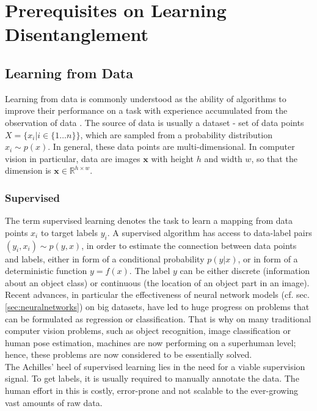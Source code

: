 \chapter{Prerequisites on Learning Disentanglement}\label{sec:prerequisites}

\section{Learning from Data}
	{Learning from data} is commonly understood as the ability of algorithms to improve their performance on a task with experience accumulated from the observation of data \cite{goodfellow16dlb}. The source of data is usually a dataset - set of data points $X = \{x_i | i \in \{1\ldots n\} \}$, which are sampled from a probability distribution $x_i \sim p(x)$.
	In general, these data points are multi-dimensional. In computer vision in particular, data are images $\mathbf{x}$ with height $h$ and width $w$, so that the dimension is $\mathbf{x} \in \mathbb{R}^{h \times w}$.

	\subsection{Supervised}\label{sec:supervised}
		The term {supervised learning} denotes the task to learn a mapping from data points $x_i$ to target labels $y_i$.
		A supervised algorithm has access to data-label pairs  $(y_i, x_i) \sim p(y, x)$, in order to estimate the connection between data points and labels, either in form of a conditional probability $p(y|x)$, or in form of a deterministic function $y = f(x)$.
		The label $y$ can be either discrete (\eg information about an object class) or continuous (\eg the location of an object part in an image).
		Recent advances, in particular the effectiveness of neural network models (cf. sec. \ref{sec:neuralnetworks}) on big datasets, have led to huge progress on problems that can be formulated as regression or classification. That is why on many traditional computer vision problems, such as \eg object recognition, image classification or human pose estimation, machines are now performing on a superhuman level; hence, these problems are now considered to be essentially solved.\\
		The Achilles' heel of supervised learning lies in the need for a viable supervision signal. To get labels, it is usually required to manually annotate the data. The human effort in this is costly, error-prone and not scalable to the ever-growing vast amounts of raw data.

